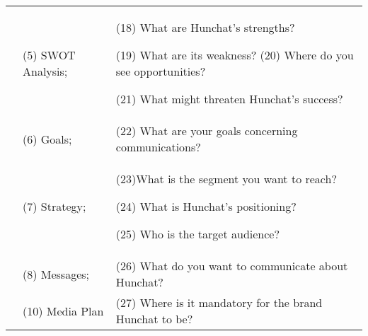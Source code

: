 \documentclass[12pt]{article}
\begin{document}
\begin{table}[htb]
\begin{tabular}{ @{}P{0.15\textwidth}P{0.2\textwidth}P{0.6\textwidth}@{} }
                            & (5) SWOT Analysis;     & (18) What are Hunchat's strengths?   \par  (19) What are its weakness?  (20) Where do you see opportunities?   \par  (21) What might threaten Hunchat's success?                                                                                                                                                                                                                                 \\
                            & (6) Goals;             & (22) What are your goals concerning communications?                                                                                                                                                                                                                                                                                                                                                                              \\
                            & (7) Strategy;          & (23)What is the segment you want to reach? \par (24) What is Hunchat’s positioning?  \par  (25) Who is the target audience?                                                                                                                                                                                                                                                                      \\
                            & (8) Messages;          & (26) What do you want to communicate about Hunchat?                                                                                                                                                                                                                                                                                                                                                                              \\
                            & (10) Media Plan        & (27) Where is it mandatory for the brand Hunchat to be?                                                                                                                                                                                                                                                                                                                                                                          \\

\end{tabular}
\end{table}
\end{document}
